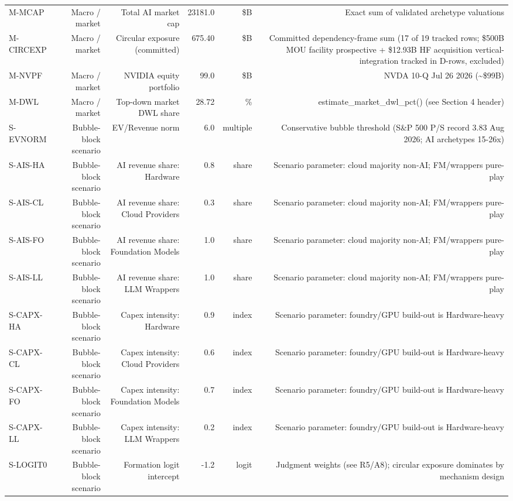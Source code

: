 \begin{tabular}{@{}lrrrrr@{}}
M-MCAP & Macro / market & Total AI market cap & 23181.0 & \$B & Exact sum of validated archetype valuations \\
M-CIRCEXP & Macro / market & Circular exposure (committed) & 675.40 & \$B & Committed dependency-frame sum (17 of 19 tracked rows; \$500B MOU facility prospective + \$12.93B HF acquisition vertical-integration tracked in D-rows, excluded) \\
M-NVPF & Macro / market & NVIDIA equity portfolio & 99.0 & \$B & NVDA 10-Q Jul 26 2026 (\textasciitilde{}\$99B) \\
M-DWL & Macro / market & Top-down market DWL share & 28.72 & \% & estimate\_market\_dwl\_pct() (see Section 4 header) \\
S-EVNORM & Bubble-block scenario & EV/Revenue norm & 6.0 & multiple & Conservative bubble threshold (S\&P 500 P/S record 3.83 Aug 2026; AI archetypes 15-26x) \\
S-AIS-HA & Bubble-block scenario & AI revenue share: Hardware & 0.8 & share & Scenario parameter: cloud majority non-AI; FM/wrappers pure-play \\
S-AIS-CL & Bubble-block scenario & AI revenue share: Cloud Providers & 0.3 & share & Scenario parameter: cloud majority non-AI; FM/wrappers pure-play \\
S-AIS-FO & Bubble-block scenario & AI revenue share: Foundation Models & 1.0 & share & Scenario parameter: cloud majority non-AI; FM/wrappers pure-play \\
S-AIS-LL & Bubble-block scenario & AI revenue share: LLM Wrappers & 1.0 & share & Scenario parameter: cloud majority non-AI; FM/wrappers pure-play \\
S-CAPX-HA & Bubble-block scenario & Capex intensity: Hardware & 0.9 & index & Scenario parameter: foundry/GPU build-out is Hardware-heavy \\
S-CAPX-CL & Bubble-block scenario & Capex intensity: Cloud Providers & 0.6 & index & Scenario parameter: foundry/GPU build-out is Hardware-heavy \\
S-CAPX-FO & Bubble-block scenario & Capex intensity: Foundation Models & 0.7 & index & Scenario parameter: foundry/GPU build-out is Hardware-heavy \\
S-CAPX-LL & Bubble-block scenario & Capex intensity: LLM Wrappers & 0.2 & index & Scenario parameter: foundry/GPU build-out is Hardware-heavy \\
S-LOGIT0 & Bubble-block scenario & Formation logit intercept & -1.2 & logit & Judgment weights (see R5/A8); circular exposure dominates by mechanism design \\

\end{tabular}
